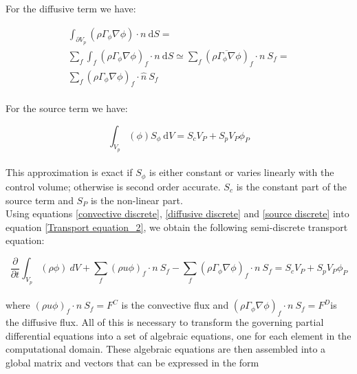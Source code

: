 \documentclass[a5paper]{sapthesis}
\begin{document}
	For the diffusive term we have:
	
	\begin{equation}
		\begin{aligned}
			\int_{\partial{V_{p}}}{(\rho \Gamma_{\phi} \nabla \phi)} \cdot n\ \mathrm{d}S = \\ 
			\sum_{f}\int_{f}{(\rho \Gamma_{\phi} \nabla \phi)_{f}} \cdot n\ \mathrm{d}S \simeq \sum_{f} (\overline{\rho \Gamma_{\phi} \nabla \phi})_{f} \cdot n \ S_{f} =\\
			\sum_{f} (\rho \Gamma_{\phi} \nabla \phi)_{f} \cdot \hat{n} \ S_{f}
		\label{diffusive discrete}
	\end{aligned} 
	\end{equation}
	\\
	For the source term we have:
	
	\begin{equation}
		\int_{V_{p}}{(\phi) S_{\phi}} \ \mathrm{d}V = S_{c}V_{P} + S_{p}V_{P}\phi_{P}
		\label{source discrete}
	\end{equation}	
	\\
	This approximation is exact if $S_{\phi}$ is either constant or varies linearly with the control volume; otherwise is second order accurate. $S_{c}$ is the constant part of the source term and $S_{P}$ is the non-linear part.
	\\
	Using equations \ref{convective discrete}, \ref{diffusive discrete} and \ref{source discrete} into equation \ref{Transport equation_2}, we obtain the following  semi-discrete transport equation:
	
	\begin{equation}
		\dfrac{\partial}{\partial{t}}\int_{V_{p}}{{(\rho \phi)}}\ dV + \sum_{f} (\rho u \phi)_{f} \cdot n \ S_{f} - \sum_{f} (\rho \Gamma_{\phi} \nabla \phi)_{f} \cdot n \ S_{f} = S_{c}V_{P} + S_{p}V_{P}\phi_{P}
		\label{Discrete transport equation_2}
	\end{equation}
	\\
	where $(\rho u \phi)_{f} \cdot n \ S_{f} = F^{C}$ is the convective flux and $(\rho \Gamma_{\phi} \nabla \phi)_{f} \cdot n \ S_{f}=F^{D}$is the diffusive flux.
	All of this is necessary to transform the governing partial differential equations into a set of algebraic equations, one for each element in the computational domain. These algebraic equations are then assembled into a global matrix and vectors that can be expressed in the form 
	
\end{document}
